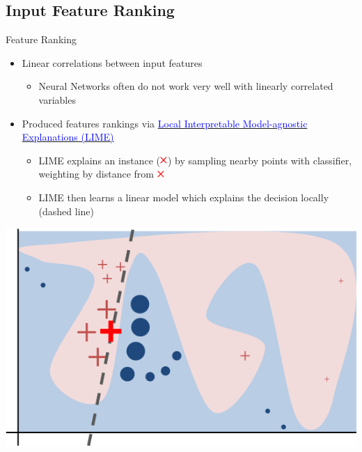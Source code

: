 \documentclass[aspectratio=169,xcolor=table]{beamer}
\newcommand{\Cross}{$\mathbin{\tikz [x=1.4ex,y=1.4ex,line width=.2ex, red] \draw (0,0) -- (1,1) (0,1) -- (1,0);}$}%
\begin{document}
  \subsection{Input Feature Ranking}

    \begin{frame}[t]{Feature Ranking}%
      \begin{itemize}
        \item Linear correlations between input features
          \begin{itemize}
            \item Neural Networks often do not work very well with linearly correlated variables
          \end{itemize}
        \item Produced features rankings via \href{https://github.com/marcotcr/lime}{\textcolor{blue}{Local Interpretable Model-agnostic Explanations (LIME)}}
        \begin{itemize}
          \item LIME explains an instance (\Cross) by sampling nearby points with classifier, weighting by distance from \Cross
          \item LIME then learns a linear model which explains the decision locally (dashed line)
        \end{itemize}
      \end{itemize}
          \centering
          \includegraphics[width=.35\textwidth,keepaspectratio=true]{limeToyExplanation.png}
    \end{frame}
\end{document}
